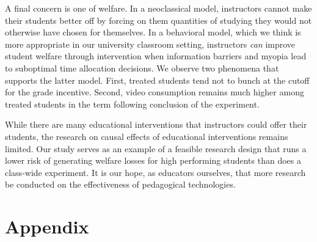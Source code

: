\documentclass[12pt]{article}
\begin{document}
A final concern is one of welfare. In a neoclassical model, instructors cannot make their students better off by forcing on them quantities of studying they would not otherwise have chosen for themselves. In a behavioral model, which we think is more appropriate in our university classroom setting, instructors \textit{can} improve student welfare through intervention when information barriers and myopia lead to suboptimal time allocation decisions. We observe two phenomena that supports the latter model. First, treated students tend not to bunch at the cutoff for the grade incentive. Second, video consumption remains much higher among treated students in the term following conclusion of the experiment.

While there are many educational interventions that instructors could offer their students, the research on causal effects of educational interventions remains limited. Our study serves as an example of a feasible research design that runs a lower risk of generating welfare losses for high performing students than does a class-wide experiment. It is our hope, as educators ourselves, that more research be conducted on the effectiveness of pedagogical technologies.

\printbibliography


\clearpage


\clearpage


\clearpage


\clearpage


\clearpage


\clearpage






\clearpage

\section*{Appendix}

\renewcommand{\thesubsection}{\Alph{subsection}}
\end{document}
